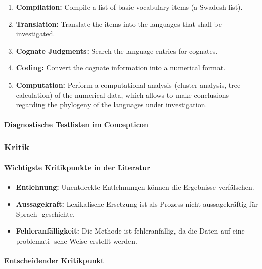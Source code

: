 \begin{enumerate}
\itemsep1pt\parskip0pt
\item
  \textbf{Compilation:} Compile a list of basic vocabulary items (a
  Swadesh-list).
\item
  \textbf{Translation:} Translate the items into the languages that
  shall be investigated.
\item
  \textbf{Cognate Judgments:} Search the language entries for cognates.
\item
  \textbf{Coding:} Convert the cognate information into a numerical
  format.
\item
  \textbf{Computation:} Perform a computational analysis (cluster
  analysis, tree calculation) of the numerical data, which allows to
  make conclusions regarding the phylogeny of the languages under
  investigation.
\end{enumerate}



\paragraph{Diagnostische Testlisten im
\href{http://concepticon.clld.org}{Concepticon}}



\subsubsection{\texorpdfstring{{Kritik}}{Kritik}}

\paragraph{Wichtigste Kritikpunkte in der Literatur}

\begin{itemize}
\itemsep1pt\parskip0pt
\item
  \textbf{Entlehnung:} Unentdeckte Entlehnungen können die Ergebnisse
  verfälschen.
\item
  \textbf{Aussagekraft:} Lexikalische Ersetzung ist als Prozess nicht
  aussagekräftig für Sprach- geschichte.
\item
  \textbf{Fehleranfälligkeit:} Die Methode ist fehleranfällig, da die
  Daten auf eine problemati- sche Weise erstellt werden.
\end{itemize}




\paragraph{Entscheidender Kritikpunkt}

